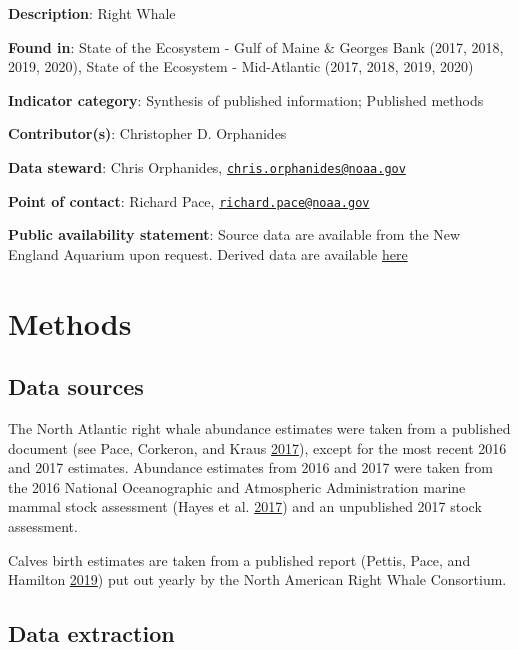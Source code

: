 \documentclass[
]{book}
\begin{document}
\textbf{Description}: Right Whale

\textbf{Found in}: State of the Ecosystem - Gulf of Maine \& Georges Bank (2017, 2018, 2019, 2020), State of the Ecosystem - Mid-Atlantic (2017, 2018, 2019, 2020)

\textbf{Indicator category}: Synthesis of published information; Published methods

\textbf{Contributor(s)}: Christopher D. Orphanides

\textbf{Data steward}: Chris Orphanides, \href{mailto:chris.orphanides@noaa.gov}{\nolinkurl{chris.orphanides@noaa.gov}}

\textbf{Point of contact}: Richard Pace, \href{mailto:richard.pace@noaa.gov}{\nolinkurl{richard.pace@noaa.gov}}

\textbf{Public availability statement}: Source data are available from the New England Aquarium upon request. Derived data are available \href{http://comet.nefsc.noaa.gov/erddap/tabledap/protected_species_soe_v1.html}{here}

\hypertarget{methods-31}{%
\section{Methods}\label{methods-31}}

\hypertarget{data-sources-31}{%
\subsection{Data sources}\label{data-sources-31}}

The North Atlantic right whale abundance estimates were taken from a published document (see Pace, Corkeron, and Kraus \protect\hyperlink{ref-Pace2017}{2017}), except for the most recent 2016 and 2017 estimates. Abundance estimates from 2016 and 2017 were taken from the 2016 National Oceanographic and Atmospheric Administration marine mammal stock assessment (Hayes et al. \protect\hyperlink{ref-Hayes2017}{2017}) and an unpublished 2017 stock assessment.

Calves birth estimates are taken from a published report (Pettis, Pace, and Hamilton \protect\hyperlink{ref-narw2019}{2019}) put out yearly by the North American Right Whale Consortium.

\hypertarget{data-extraction-26}{%
\subsection{Data extraction}\label{data-extraction-26}}
\end{document}
